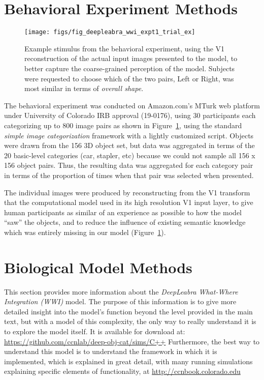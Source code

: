 \documentclass[12pt,twoside]{naturefigs}
\newif\myifpdf
\begin{document}

\section{Behavioral Experiment Methods}

\begin{figure}
  \centering\texttt{[image: figs/fig\_deepleabra\_wwi\_expt1\_trial\_ex]}
  \caption{Example stimulus from the behavioral experiment, using the V1 reconstruction of the actual input images presented to the model, to better capture the coarse-grained perception of the model.  Subjects were requested to choose which of the two pairs, Left or Right, was most similar in terms of {\em overall shape}.}
  \label{fig.expt}
\end{figure}

The behavioral experiment was conducted on Amazon.com's MTurk web platform under University of Colorado IRB approval (19-0176), using 30 participants each categorizing up to 800 image pairs as shown in Figure~\ref{fig.expt}, using the standard {\em simple image categorization} framework with a lightly customized script.  Objects were drawn from the 156 3D object set, but data was aggregated in terms of the 20 basic-level categories (car, stapler, etc) because we could not sample all 156 x 156 object pairs.  Thus, the resulting data was aggregated for each category pair in terms of the proportion of times when that pair was selected when presented.

The individual images were produced by reconstructing from the V1 transform that the computational model used in its high resolution V1 input layer, to give human participants as similar of an experience as possible to how the model ``saw'' the objects, and to reduce the influence of existing semantic knowledge which was entirely missing in our model (Figure~\ref{fig.expt}).

\section{Biological Model Methods}

This section provides more information about the {\em DeepLeabra} {\em What-Where Integration (WWI)} model.  The purpose of this information is to give more detailed insight into the model's function beyond the level provided in the main text, but with a model of this complexity, the only way to really understand it is to explore the model itself.  It is available for download at: \url{https://github.com/ccnlab/deep-obj-cat/sims/C++}  Furthermore, the best way to understand this model is to understand the framework in which it is implemented, which is explained in great detail, with many running simulations explaining specific elements of functionality, at \url{http://ccnbook.colorado.edu}
\end{document}
